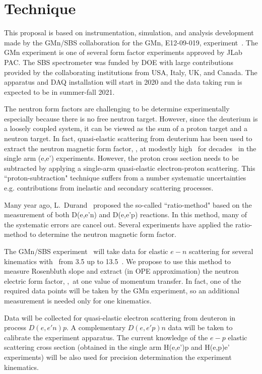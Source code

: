 \section{Technique}\label{sec:exp_method}
%
This proposal is based on instrumentation, simulation, and analysis development made by the GMn/SBS collaboration for the GMn, E12-09-019, experiment~\cite{E12-09-019}.
The GMn experiment is one of several form factor experiments approved by JLab PAC. 
The SBS spectrometer was funded by DOE with large contributions provided by the collaborating institutions from USA, Italy, UK, and Canada. 
The apparatus and DAQ installation will start in 2020 and the data taking run is expected to be in summer-fall 2021.

The neutron form factors are challenging to be determine experimentally especially because there is no free neutron target. 
However, since the deuterium is a loosely coupled system, it can be viewed as the sum of a proton target and a neutron target. 
In fact, quasi-elastic scattering from deuterium has been used to extract the neutron magnetic form factor, \gmn, at modestly high \qsq~for decades~\cite{Hughes:1965zza, Arnold:1988us} in the single arm (e,e') experiments. 
However, the proton cross section needs to be subtracted by applying a single-arm quasi-elastic electron-proton scattering. 
This ``proton-subtraction" technique suffers from a number systematic uncertainties e.g. contributions from inelastic and secondary scattering processes. 

Many year ago, L.~Durand~\cite{Durand:1959zz} proposed the so-called ``ratio-method" based on the measurement of both D(e,e'n) and D(e,e'p) reactions. 
In this method, many of the systematic errors are cancel out. 
Several experiments \cite{Bruins:1995ns, Kubon:2001rj, Lachniet:2008qf} have applied the ratio-method to determine the neutron magnetic form factor.

The GMn/SBS experiment~\cite{E12-09-019} will take data for elastic $e-n$ scattering for several kinematics with \qsq~from 3.5 up to 13.5~\gevcsq.
We propose to use this method to measure Rosenbluth slope and extract (in OPE approximation) the neutron electric form factor, \gen,~at one value of momentum transfer.
In fact, one of the required data points will be taken by the GMn experiment, so an additional measurement is needed only for one
kinematics.

Data will be collected for quasi-elastic electron scattering from deuteron in process $D(e,e'n)p$. 
A complementary $D(e,e'p)n$ data will be taken to calibrate the experiment apparatus.
The current knowledge of the $e-p$ elastic scattering cross section (obtained in the single arm H(e,e')p and H(e,p)e' experiments) will be also used
for precision determination the experiment kinematics.

